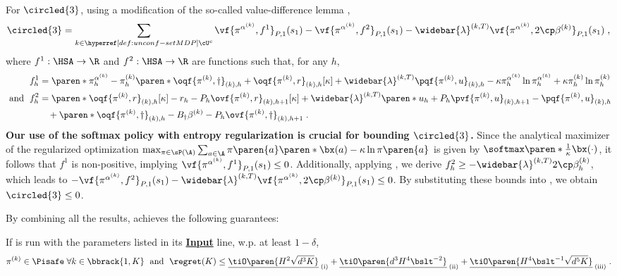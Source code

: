 For $\circled{3}$, using a modification of the so-called value-difference lemma \citep{shani2020optimistic},
\begin{align}\label{eq:third-term-decompose}
\circled{3} =
\sum_{k \in \unconfMDP^c}
\vf{\pi^{\alpha^{(k)}}, f^1}_{P, 1}(s_1) 
- \vf{\pi^{\alpha^{(k)}}, f^2}_{P, 1}(s_1) 
- \widebar{\lambda}^{(k, T)}\vf{\pi^{\alpha^{(k)}}, 2\cp \beta^{(k)}}_{P, 1}(s_1)\;, 
\end{align}
where $f^1: \HSA\to \R$ and $f^2: \HSA\to \R$ are functions such that, for any $h$,
\begin{align*}
&
f^1_h = 
\paren*{\pi^{\alpha^{(k)}}_h - \pi^{(k)}_h}
\paren*{
\oqf{\pi^{(k)}, \dagger}_{(k), h} +
\oqf{\pi^{(k)}, r}_{(k), h}[\kappa] + \widebar{\lambda}^{(k, T)} 
\pqf{\pi^{(k)}, u}_{(k), h}
}
- \kappa\pi^{\alpha^{(k)}}_h\ln \pi^{\alpha^{(k)}}_h 
+ \kappa \pi^{(k)}_h \ln \pi^{(k)}_h
\\
\text{ and }\; &
f^2_h = 
\paren*{\oqf{\pi^{(k)}, r}_{(k), h}[\kappa]
- r_h - P_h \ovf{\pi^{(k)}, r}_{(k), h+1}[\kappa]}
+ \widebar{\lambda}^{(k, T)}\paren*{u_h + P_h \pvf{\pi^{(k)}, u}_{(k), h+1} - \pqf{\pi^{(k)}, u}_{(k), h}}\\
&\quad \quad+ \paren*{\oqf{\pi^{(k)}, \dagger}_{(k), h} - B_\dagger \beta^{(k)} - P_h \ovf{\pi^{(k)}, \dagger}_{(k), h+1}}\;.
\end{align*}
\textbf{Our use of the softmax policy with entropy regularization is crucial for bounding $\circled{3}$.}
Since the analytical maximizer of the regularized optimization 
\(
\max_{\pi \in \sP(\A)}
\sum_{a \in \A}
\pi\paren{a} \paren*{\bx(a) - \kappa \ln \pi\paren{a}}
\) is given by  $\softmax\paren*{\frac{1}{\kappa} \bx(\cdot)}$, it follows that $f^1$ is non-positive, implying $\vf{\pi^{\alpha^{(k)}}, f^1}_{P, 1}(s_1) \leq 0$.
Additionally, applying , we derive 
\(
f^2_h \geq -\widebar{\lambda}^{(k, T)} 2\cp \beta^{(k)}_h
\), which leads to
\(-\vf{\pi^{\alpha^{(k)}}, f^2}_{P, 1}(s_1) 
-\widebar{\lambda}^{(k, T)}\vf{\pi^{\alpha^{(k)}}, 2\cp \beta^{(k)}}_{P, 1}(s_1) 
\leq 0\).
By substituting these bounds into , we obtain $\circled{3} \leq 0$.

By combining all the results,  achieves the following guarantees:
\begin{theorem}\label{theorem:MDP-regret-main}
If \MDPalgo is run with the parameters listed in its \hyperref[algo:zero-vio-linear MDP]{\textbf{Input}} line, w.p. at least $1-\delta$,
\begin{align*}
\pi^{(k)} \in \Pisafe \; \forall k \in \bbrack{1, K} 
\; \text{ and }\; 
\regret (K) \leq 
\underline{
\tiO\paren{H^{2} \sqrt{d^3 K}}
}_{\;(\mathrm{i})}
+ 
\underline{
\tiO\paren{d^3H^4 \bslt^{-2}}
}_{\;(\mathrm{ii})}
+ 
\underline{
\tiO\paren{H^{4} \bslt^{-1}\sqrt{d^5 K}}
}_{\;(\mathrm{iii})}\;.
\end{align*}
\end{theorem}

